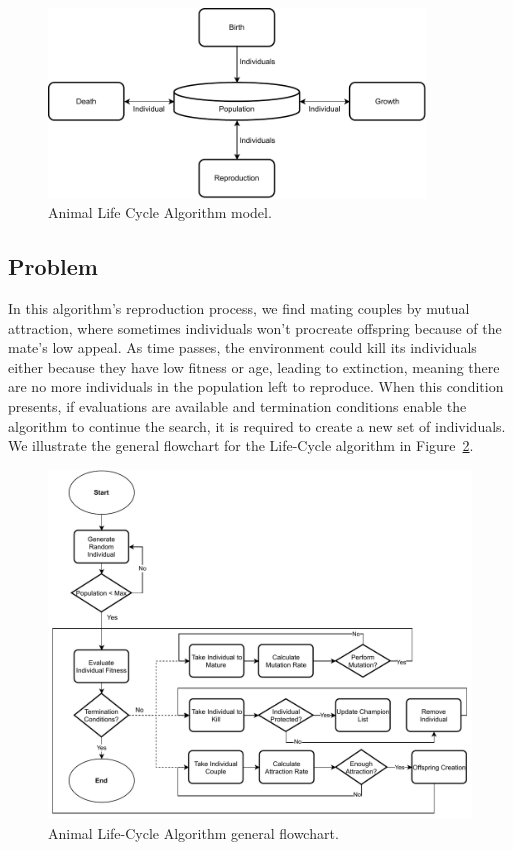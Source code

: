 \documentclass[graybox]{svmult}
\begin{document}
        \begin{figure}
            \centering
            \includegraphics[width=100mm]{img/fig_algorithm_model.pdf}
            \caption{Animal Life Cycle Algorithm model.} \label{fig.algorithm_model}
            \end{figure}

    \subsection{Problem}

        In this algorithm's reproduction process, we find mating couples by mutual
        attraction, where sometimes individuals won't procreate offspring because of
        the mate's low appeal. As time passes, the environment could kill its
        individuals either because they have low fitness or age, leading to extinction,
        meaning there are no more individuals in the population left to reproduce. When
        this condition presents, if evaluations are available and termination
        conditions enable the algorithm to continue the search, it is required to
        create a new set of individuals. We illustrate the general flowchart for the
        Life-Cycle algorithm in Figure~\ref{fig.flowchart}.
        

        \begin{figure}
            \includegraphics[width=\textwidth]{img/fig_flowchart.pdf}
            \caption{Animal Life-Cycle Algorithm general flowchart.} \label{fig.flowchart}
            \end{figure}
\end{document}
